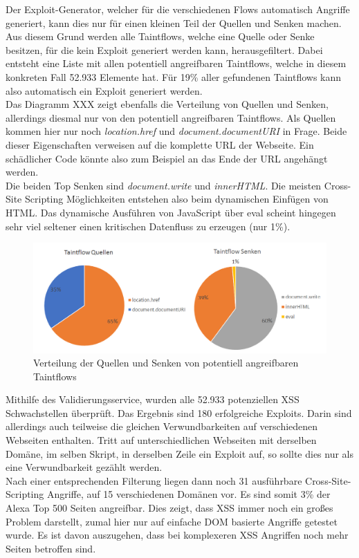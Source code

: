 Der Exploit-Generator, welcher für die verschiedenen Flows automatisch Angriffe generiert, kann dies nur für einen kleinen Teil der Quellen und Senken machen. Aus diesem Grund werden alle Taintflows, welche eine Quelle oder Senke besitzen, für die kein Exploit generiert werden kann, herausgefiltert. Dabei entsteht eine Liste mit allen potentiell angreifbaren Taintflows, welche in diesem konkreten Fall 52.933 Elemente hat. Für 19\% aller gefundenen Taintflows kann also automatisch ein Exploit generiert werden. \\
Das Diagramm XXX zeigt ebenfalls die Verteilung von Quellen und Senken, allerdings diesmal nur von den potentiell angreifbaren Taintflows. Als Quellen kommen hier nur noch \textit{location.href} und \textit{document.documentURI} in Frage. Beide dieser Eigenschaften verweisen auf die komplette URL der Webseite. Ein schädlicher Code könnte also zum Beispiel an das Ende der URL angehängt werden. \\
Die beiden Top Senken sind \textit{document.write} und \textit{innerHTML}. Die meisten Cross-Site Scripting Möglichkeiten entstehen also beim dynamischen Einfügen von HTML. Das dynamische Ausführen von JavaScript über eval scheint hingegen sehr viel seltener einen kritischen Datenfluss zu erzeugen (nur 1\%). 

\begin{figure}[h]
	\centering
	\includegraphics[width=1\textwidth]{Bilder/Diagram2.png}
	\caption{Verteilung der Quellen und Senken von potentiell angreifbaren Taintflows}
\end{figure}

Mithilfe des Validierungsservice, wurden alle 52.933 potenziellen XSS Schwachstellen überprüft. Das Ergebnis sind 180 erfolgreiche Exploits. Darin sind allerdings auch teilweise die gleichen Verwundbarkeiten auf verschiedenen Webseiten enthalten. Tritt auf unterschiedlichen Webseiten mit derselben Domäne, im selben Skript, in derselben Zeile ein Exploit auf, so sollte dies nur als eine Verwundbarkeit gezählt werden. \\
Nach einer entsprechenden Filterung liegen dann noch 31 ausführbare Cross-Site-Scripting Angriffe, auf 15 verschiedenen Domänen vor. Es sind somit 3\% der Alexa Top 500 Seiten angreifbar. Dies zeigt, dass XSS immer noch ein großes Problem darstellt, zumal hier nur auf einfache DOM basierte Angriffe getestet wurde. Es ist davon auszugehen, dass bei komplexeren XSS Angriffen noch mehr Seiten betroffen sind.
 




